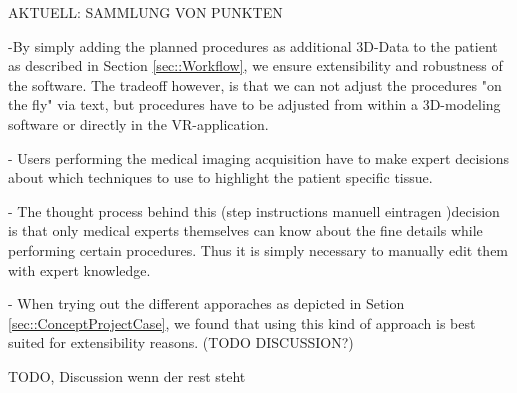AKTUELL: SAMMLUNG VON PUNKTEN

-By simply adding the planned procedures as additional 3D-Data to the patient as described in Section \ref{sec::Workflow}, we ensure extensibility and robustness of the software.
The tradeoff however, is that we can not adjust the procedures "on the fly" via text, but procedures have to be adjusted from within a 3D-modeling software or directly in the VR-application.

- Users performing the medical imaging acquisition have to make expert decisions about which techniques to use to highlight the patient specific tissue.

- The thought process behind this (step instructions manuell eintragen )decision is that only medical experts themselves can know about the fine details while performing certain procedures.
Thus it is simply necessary to manually edit them with expert knowledge.

- When trying out the different apporaches as depicted in Setion \ref{sec::ConceptProjectCase}, we found that using this kind of approach is best suited for extensibility reasons. (TODO DISCUSSION?)

TODO, Discussion wenn der rest steht
